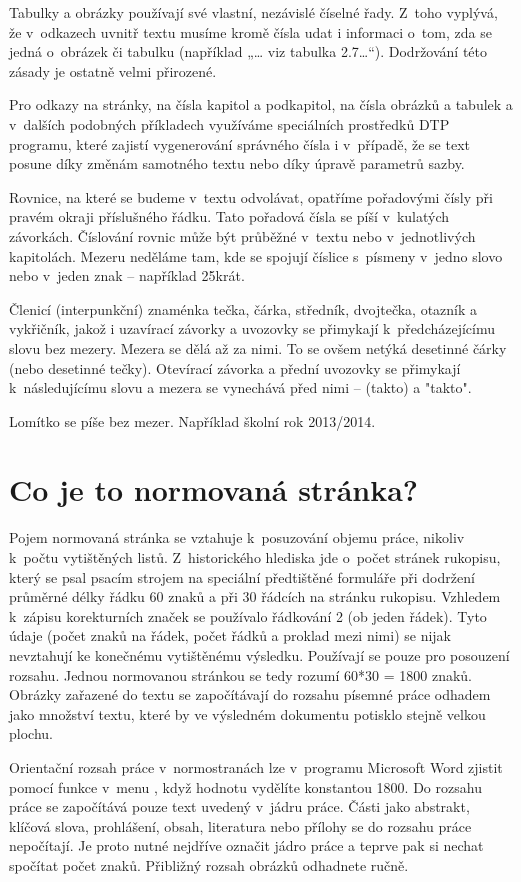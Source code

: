 Tabulky a obrázky používají své vlastní, nezávislé číselné řady.
Z~toho vyplývá, že v~odkazech uvnitř textu musíme kromě čísla udat i informaci o~tom, zda se jedná o~obrázek či tabulku (například „… viz tabulka 2.7…“).
Dodržování této zásady je ostatně velmi přirozené.

Pro odkazy na stránky, na čísla kapitol a podkapitol, na čísla obrázků a tabulek a v~dalších podobných příkladech využíváme speciálních prostředků DTP programu, které zajistí vygenerování správného čísla i v~případě, že se text posune díky změnám samotného textu nebo díky úpravě parametrů sazby.

Rovnice, na které se budeme v~textu odvolávat, opatříme pořadovými čísly při pravém okraji příslušného řádku.
Tato pořadová čísla se píší v~kulatých závorkách.
Číslování rovnic může být průběžné v~textu nebo v~jednotlivých kapitolách.
Mezeru neděláme tam, kde se spojují číslice s~písmeny v~jedno slovo nebo v~jeden znak – například 25krát.

Členicí (interpunkční) znaménka tečka, čárka, středník, dvojtečka, otazník a vykřičník, jakož i uzavírací závorky a uvozovky se přimykají k~předcházejícímu slovu bez mezery.
Mezera se dělá až za nimi.
To se ovšem netýká desetinné čárky (nebo desetinné tečky).
Otevírací závorka a přední uvozovky se přimykají k~následujícímu slovu a mezera se vynechává před nimi – (takto) a "takto".

Lomítko se píše bez mezer.
Například školní rok 2013/2014.

\section{Co je to normovaná stránka?}
Pojem normovaná stránka se vztahuje k~posuzování objemu práce, nikoliv k~počtu vytištěných listů.
Z~historického hlediska jde o~počet stránek rukopisu, který se psal psacím strojem na speciální předtištěné formuláře při dodržení průměrné délky řádku 60 znaků a při 30 řádcích na stránku rukopisu.
Vzhledem k~zápisu korekturních značek se používalo řádkování 2 (ob jeden řádek).
Tyto údaje (počet znaků na řádek, počet řádků a proklad mezi nimi) se nijak nevztahují ke konečnému vytištěnému výsledku.
Používají se pouze pro posouzení rozsahu.
Jednou normovanou stránkou se tedy rozumí 60*30 = 1800 znaků.
Obrázky zařazené do textu se započítávají do rozsahu písemné práce odhadem jako množství textu, které by ve výsledném dokumentu potisklo stejně velkou plochu.

Orientační rozsah práce v~normostranách lze v~programu Microsoft Word zjistit pomocí funkce  v~menu , když hodnotu  vydělíte konstantou 1800.
Do rozsahu práce se započítává pouze text uvedený v~jádru práce.
Části jako abstrakt, klíčová slova, prohlášení, obsah, literatura nebo přílohy se do rozsahu práce nepočítají.
Je proto nutné nejdříve označit jádro práce a teprve pak si nechat spočítat počet znaků.
Přibližný rozsah obrázků odhadnete ručně.